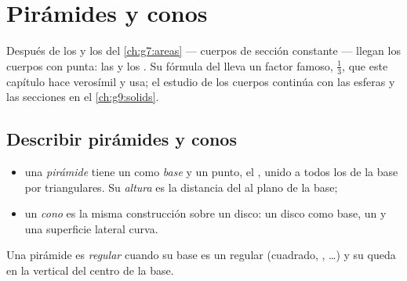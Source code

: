 \chapter{Pirámides y conos}\label{ch:g8:solids}

Después de los  y los  del \cref{ch:g7:areas} --- cuerpos de
sección constante --- llegan los cuerpos con punta: las  y
los . Su fórmula del  lleva un factor famoso, $\frac13$, que
este capítulo hace verosímil y usa; el estudio de los cuerpos continúa
con las esferas y las secciones en el \cref{ch:g9:solids}.

\section{Describir pirámides y conos}

\begin{definition}\label{def:g8:solids:def}
\begin{itemize}
  \item una \emph{pirámide} tiene un  como
        \emph{base} y un punto, el \emph{}, unido a todos los
         de la base por  triangulares. Su \emph{altura} es
        la distancia del  al plano de la base;
  \item un \emph{cono} es la misma construcción sobre un
        disco: un disco como base, un  y una superficie lateral curva.
\end{itemize}
Una pirámide es \emph{regular} cuando su base es un  regular
(cuadrado, , \dots) y su  queda en la vertical
del centro de la base.
\end{definition}

